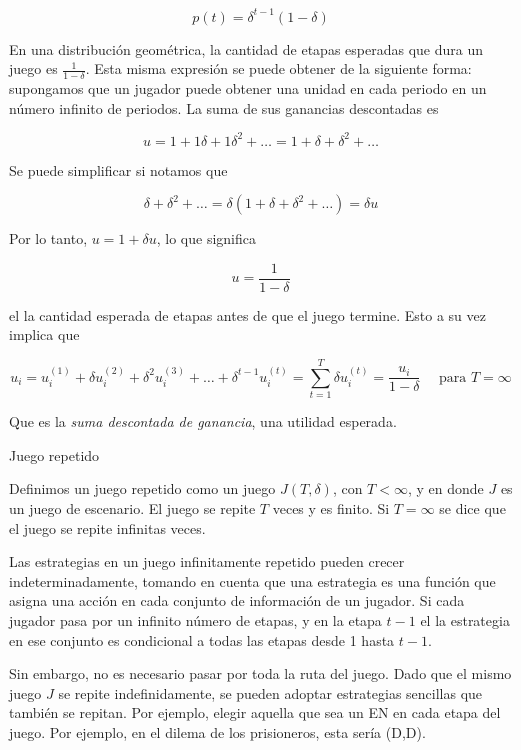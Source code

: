 \documentclass[12pt]{scrartcl}
\begin{document}
\[ 
    p(t)=\delta^{t-1}(1-\delta)
\]

En una distribución geométrica, la cantidad de etapas esperadas que dura un juego es $\frac{1}{1-\delta}$. Esta misma expresión se puede obtener de la siguiente forma: supongamos que un jugador puede obtener una unidad en cada periodo en un número infinito de periodos. La suma de sus ganancias descontadas es

\[ 
u = 1 + 1\delta + 1\delta^2 + \dots = 1 + \delta + \delta^2 + \dots
\]

Se puede simplificar si notamos que

\[ 
    \delta + \delta^2 + \dots = \delta(1 + \delta + \delta^2 + \dots) = \delta u
\]

Por lo tanto, $u=1+\delta u$, lo que significa 

\[u = \frac{1}{1-\delta} \]

el la cantidad esperada de etapas antes de que el juego termine. Esto a su vez implica que

\[ 
    u_i = u_i^{(1)} + \delta u_i^{(2)} + \delta^2 u_i^{(3)} + \dots + \delta^{t-1} u_i^{(t)} = \sum_{t=1}^{T}\delta u_i^{(t)} = \frac{u_i}{1-\delta}\quad \text{ para $T = \infty$}
\]

Que es la \textit{suma descontada de ganancia}, una utilidad esperada.

\begin{mybox}{Juego repetido}
    \begin{defi}
	    Definimos un juego repetido como un juego $J(T,\delta)$, con $T<\infty$, y en donde $J$ es un juego de escenario. El juego se repite $T$ veces y es finito. Si $T = \infty$ se dice que el juego se repite infinitas veces.
    \end{defi}
\end{mybox}

Las estrategias en un juego infinitamente repetido pueden crecer indeterminadamente, tomando en cuenta que una estrategia es una función que asigna una acción en cada conjunto de información de un jugador. Si cada jugador pasa por un infinito número de etapas, y en la etapa $t-1$ el la estrategia en ese conjunto es condicional a todas las etapas desde 1 hasta $t-1$. 

Sin embargo, no es necesario pasar por toda la ruta del juego. Dado que el mismo juego $J$ se repite indefinidamente, se pueden adoptar estrategias sencillas que también se repitan. Por ejemplo, elegir aquella que sea un EN en cada etapa del juego. Por ejemplo, en el dilema de los prisioneros, esta sería (D,D).
\end{document}
